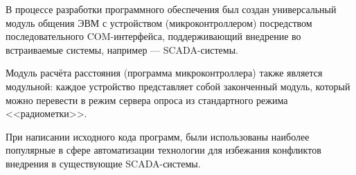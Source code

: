 В процессе разработки программного обеспечения был создан универсальный модуль общения ЭВМ с устройством (микроконтроллером) посредством последовательного COM-интерфейса, поддерживающий внедрение во встраиваемые системы, например --- SCADA-системы.

Модуль расчёта расстояния (программа микроконтроллера) также является модульной: каждое устройство представляет собой законченный модуль, который можно перевести в режим сервера опроса из стандартного режима <<радиометки>>.

При написании исходного кода программ, были использованы наиболее популярные в сфере автоматизации технологии для избежания конфликтов внедрения в существующие SCADA-системы.
